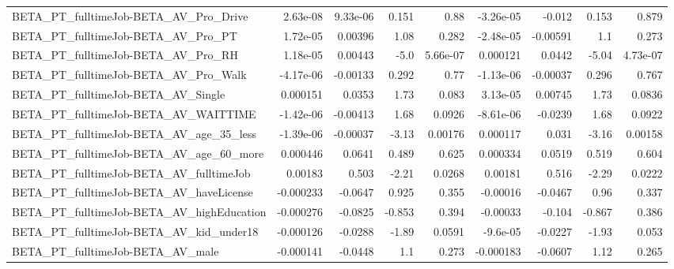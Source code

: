 \begin{tabular}{lrrrrrrrr}
BETA\_PT\_fulltimeJob-BETA\_AV\_Pro\_Drive              &    2.63e-08 &     9.33e-06 &     0.151 &     0.88 &  -3.26e-05 &      -0.012 &        0.153 &         0.879 \\
BETA\_PT\_fulltimeJob-BETA\_AV\_Pro\_PT                 &    1.72e-05 &      0.00396 &      1.08 &    0.282 &  -2.48e-05 &    -0.00591 &          1.1 &         0.273 \\
BETA\_PT\_fulltimeJob-BETA\_AV\_Pro\_RH                 &    1.18e-05 &      0.00443 &      -5.0 & 5.66e-07 &   0.000121 &      0.0442 &        -5.04 &      4.73e-07 \\
BETA\_PT\_fulltimeJob-BETA\_AV\_Pro\_Walk               &   -4.17e-06 &     -0.00133 &     0.292 &     0.77 &  -1.13e-06 &    -0.00037 &        0.296 &         0.767 \\
BETA\_PT\_fulltimeJob-BETA\_AV\_Single                 &    0.000151 &       0.0353 &      1.73 &    0.083 &   3.13e-05 &     0.00745 &         1.73 &        0.0836 \\
BETA\_PT\_fulltimeJob-BETA\_AV\_WAITTIME               &   -1.42e-06 &     -0.00413 &      1.68 &   0.0926 &  -8.61e-06 &     -0.0239 &         1.68 &        0.0922 \\
BETA\_PT\_fulltimeJob-BETA\_AV\_age\_35\_less            &   -1.39e-06 &     -0.00037 &     -3.13 &  0.00176 &   0.000117 &       0.031 &        -3.16 &       0.00158 \\
BETA\_PT\_fulltimeJob-BETA\_AV\_age\_60\_more            &    0.000446 &       0.0641 &     0.489 &    0.625 &   0.000334 &      0.0519 &        0.519 &         0.604 \\
BETA\_PT\_fulltimeJob-BETA\_AV\_fulltimeJob            &     0.00183 &        0.503 &     -2.21 &   0.0268 &    0.00181 &       0.516 &        -2.29 &        0.0222 \\
BETA\_PT\_fulltimeJob-BETA\_AV\_haveLicense            &   -0.000233 &      -0.0647 &     0.925 &    0.355 &   -0.00016 &     -0.0467 &         0.96 &         0.337 \\
BETA\_PT\_fulltimeJob-BETA\_AV\_highEducation          &   -0.000276 &      -0.0825 &    -0.853 &    0.394 &   -0.00033 &      -0.104 &       -0.867 &         0.386 \\
BETA\_PT\_fulltimeJob-BETA\_AV\_kid\_under18            &   -0.000126 &      -0.0288 &     -1.89 &   0.0591 &   -9.6e-05 &     -0.0227 &        -1.93 &         0.053 \\
BETA\_PT\_fulltimeJob-BETA\_AV\_male                   &   -0.000141 &      -0.0448 &       1.1 &    0.273 &  -0.000183 &     -0.0607 &         1.12 &         0.265 \\

\end{tabular}
